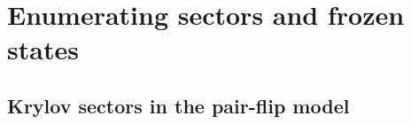 
\section{Enumerating sectors and frozen states}
\label{app:enumeration}



\subsection{Krylov sectors in the pair-flip model}

